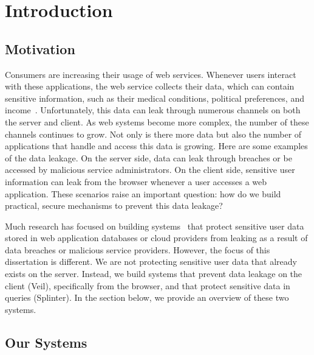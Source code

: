 \section{Introduction}
\label{chap:intro}

\subsection{Motivation}
Consumers are increasing their usage of web services. Whenever
users interact with these applications, the web service collects
their data, which can contain sensitive 
information, such as their medical conditions,
political preferences, and income~\cite{narayanan2010myths, narayanan2008robust}.
Unfortunately, this data can 
leak through numerous channels on both the server
and client. As web systems become more complex, the 
number of these channels continues to grow. 
Not only is there more data but also the number of 
applications that handle and access this data is growing.
Here are some examples of the data leakage.
On the server side, data can leak through breaches
or be accessed by malicious service administrators. On the client side,
sensitive user information can leak from the browser whenever
a user accesses a web application. These scenarios raise an important
question: how do we build practical, secure
mechanisms to prevent this data leakage?


Much research has focused on building systems~\cite{popa:mylar, popa:cryptdb, li:sundr, feldman:sporc} 
that protect sensitive user data stored in web application databases
or cloud providers from leaking as a result of data breaches or malicious service
providers. However, the focus of
this dissertation is different. We are not protecting sensitive 
user data that already exists on the server.
Instead, we build systems
that prevent data leakage on the client (Veil), specifically
from the browser, and that protect sensitive data in queries (Splinter).
In the section below, we provide an overview of these two systems.

\subsection{Our Systems}


